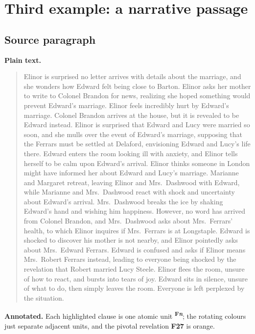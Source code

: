 \documentclass[11pt]{article}
\begin{document}
\section{Third example: a narrative passage}

\subsection*{Source paragraph}

\noindent\textbf{Plain text.}
\begin{quote}
Elinor is surprised no letter arrives with details about the marriage, and she
wonders how Edward felt being close to Barton. Elinor asks her mother to write to
Colonel Brandon for news, realizing she hoped something would prevent Edward's
marriage. Elinor feels incredibly hurt by Edward's marriage. Colonel Brandon
arrives at the house, but it is revealed to be Edward instead. Elinor is surprised
that Edward and Lucy were married so soon, and she mulls over the event of
Edward's marriage, supposing that the Ferrars must be settled at Delaford,
envisioning Edward and Lucy's life there. Edward enters the room looking ill with
anxiety, and Elinor tells herself to be calm upon Edward's arrival. Elinor thinks
someone in London might have informed her about Edward and Lucy's marriage.
Marianne and Margaret retreat, leaving Elinor and Mrs.~Dashwood with Edward,
while Marianne and Mrs.~Dashwood react with shock and uncertainty about Edward's
arrival. Mrs.~Dashwood breaks the ice by shaking Edward's hand and wishing him
happiness. However, no word has arrived from Colonel Brandon, and Mrs.~Dashwood
asks about Mrs.~Ferrars' health, to which Elinor inquires if Mrs.~Ferrars is at
Longstaple. Edward is shocked to discover his mother is not nearby, and Elinor
pointedly asks about Mrs.~Edward Ferrars. Edward is confused and asks if Elinor
means Mrs.~Robert Ferrars instead, leading to everyone being shocked by the
revelation that Robert married Lucy Steele. Elinor flees the room, unsure of how
to react, and bursts into tears of joy. Edward sits in silence, unsure of what to
do, then simply leaves the room. Everyone is left perplexed by the situation.
\end{quote}

\noindent\textbf{Annotated.} Each highlighted clause is one atomic unit
\textsuperscript{\textbf{\scriptsize F\textit{n}}}; the rotating colours just
separate adjacent units, and the pivotal revelation \textbf{F27} is orange.
\end{document}
